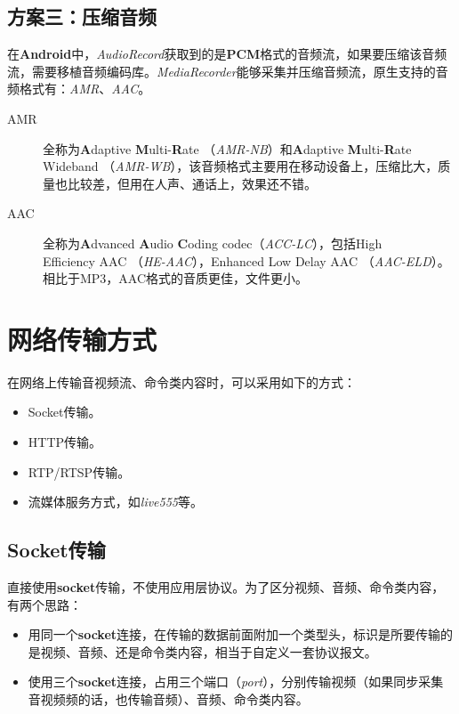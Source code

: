 \documentclass[11pt,a4paper]{article}
\begin{document}
\begin{CJK}{UTF8}{gbsn}
    \subsection{方案三：压缩音频}
    在\textbf{Android}中，\emph{AudioRecord}获取到的是\textbf{PCM}格式的音频流，如果要压缩该音频流，需要移植音频编码库。\emph{MediaRecorder}能够采集并压缩音频流，原生支持的音频格式有：\emph{AMR}、\emph{AAC}。
    \begin{description}
        \item[AMR] 全称为\textbf{A}daptive \textbf{M}ulti-\textbf{R}ate （\emph{AMR-NB}）和\textbf{A}daptive \textbf{M}ulti-\textbf{R}ate Wideband （\emph{AMR-WB}），该音频格式主要用在移动设备上，压缩比大，质量也比较差，但用在人声、通话上，效果还不错。
        \item[AAC] 全称为\textbf{A}dvanced \textbf{A}udio \textbf{C}oding codec（\emph{ACC-LC}），包括High\\Efficiency AAC （\emph{HE-AAC}），Enhanced Low Delay AAC （\emph{AAC-ELD}）。相比于MP3，AAC格式的音质更佳，文件更小。
    \end{description}

    \section{网络传输方式}
    在网络上传输音视频流、命令类内容时，可以采用如下的方式：
    \begin{itemize}
        \item Socket传输。
        \item HTTP传输。
        \item RTP/RTSP传输。
        \item 流媒体服务方式，如\emph{live555}等。
    \end{itemize}

    \subsection{Socket传输}
    直接使用\textbf{socket}传输，不使用应用层协议。为了区分视频、音频、命令类内容，有两个思路：
    \begin{itemize}
        \item 用同一个\textbf{socket}连接，在传输的数据前面附加一个类型头，标识是所要传输的是视频、音频、还是命令类内容，相当于自定义一套协议报文。
        \item 使用三个\textbf{socket}连接，占用三个端口（\emph{port}），分别传输视频（如果同步采集音视频频的话，也传输音频）、音频、命令类内容。
    \end{itemize}


\end{CJK}
\end{document}

